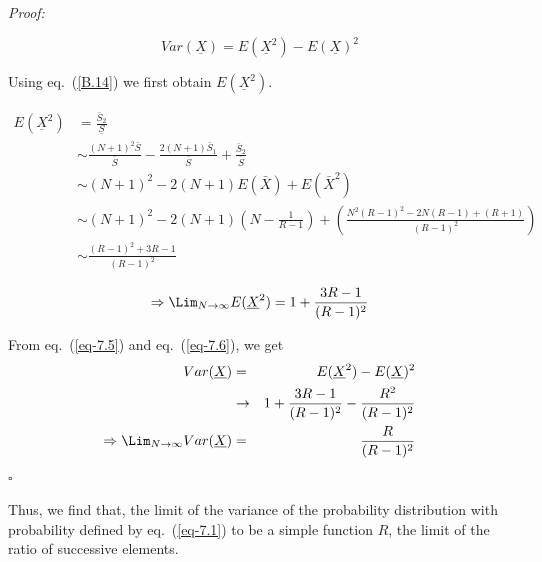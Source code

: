 \begin{multicols}{2}
\vspace{-.6cm}

{\it Proof:}

\begin{equation}
Var(\underline{X}) = E(\underline{X}^2) - E(\underline{X})^2\label{eq-7.4}
\end{equation}

Using eq.~(\ref{B.14}) we first obtain $E(\underline{X}^2)$.

\vspace{-.5cm}

{\fontsize{6}{7}\selectfont
\begin{align}
E(\underline{X}^2) &= \frac{\bar{S}_2}{\underline{S}} \nonumber\\
&\sim \frac{(N+1)^2\bar{S}}{\bar{S}} - \frac{2(N+1)\bar{S}_1}{\bar{S}} + \frac{\bar{S}_2}{\bar{S}}\nonumber\\
&\sim (N+1)^2 - 2(N+1)E(\bar{X}) +E(\bar{X}^2)\nonumber\\
&\sim (N+1)^2 - 2(N+1)\left(N-\frac{1}{R-1}\right) + \left(\frac{N^2(R-1)^2 - 2N(R-1)+(R+1)}{(R-1)^2}\right)\nonumber\\
&\sim \frac{(R-1)^2 +3R -1}{(R-1)^2}\nonumber
\end{align}}

\vspace{-1cm}

\begin{equation}
\Rightarrow \Lim_{N \rightarrow \infty}E(\underline{X}^2) = 1 + \displaystyle{\frac{3R-1}{(R-1)^2}}\label{eq-7.5}
\end{equation} 

From eq.~(\ref{eq-7.5}) and eq.~(\ref{eq-7.6}), we get 
\begin{align}
Var(\underline{X}) &=& E(\underline{X}^2) - E(\underline{X})^2\nonumber\\
&\rightarrow& 1 + \frac{3R-1}{(R-1)^2} - \frac{R^2}{(R-1)^2}\nonumber\\ 
\Rightarrow \Lim_{N \rightarrow \infty}Var(\underline{X}) &=& \frac{R}{(R-1)^2}\label{eq-7.6}
\end{align}
\hfill{$\square$}\\

\vspace{-.8cm}

Thus, we find that, the limit of the variance of the probability distribution with probability defined by eq.~(\ref{eq-7.1}) to be a simple function $R$, the limit of the ratio of successive elements.

\vspace{-.2cm}


\end{multicols}
